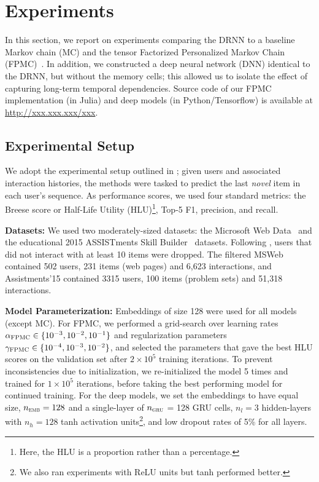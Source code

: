 \documentclass{sig-alternate-05-2015}
\begin{document}
\section{Experiments}
In this section, we report on experiments comparing the DRNN to a baseline Markov chain (MC) and the tensor Factorized Personalized Markov Chain (FPMC)~\cite{Rendle2010}. In addition, we constructed a deep neural network (DNN) identical to the DRNN, but without the memory cells; this allowed us to isolate the effect of capturing long-term temporal dependencies. Source code of our FPMC implementation (in Julia) and deep models (in Python/Tensorflow) is available at \url{http://xxx.xxx.xxx/xxx}.

\subsection{Experimental Setup}
We adopt the experimental setup outlined in \cite{Rendle2010};  given users and associated interaction histories, the methods were tasked to predict the last \emph{novel} item in each user's sequence. As performance scores, we used four standard metrics: the Breese score or Half-Life Utility (HLU)\footnote{Here, the HLU is a proportion rather than a percentage.}, Top-5 F1, precision, and recall. 

\vspace{2mm}
\noindent\textbf{Datasets:} We used two moderately-sized datasets: the Microsoft Web Data~\cite{Breese1998} and the educational 2015 ASSISTments Skill Builder~\cite{Assistmentsdata} datasets. Following \cite{Rendle2010}, users that did not interact with at least 10 items were dropped. The filtered MSWeb contained 502 users, 231 items (web pages) and 6,623 interactions, and  Assistments'15 contained 3315 users, 100 items (problem sets) and 51,318 interactions. 

\vspace{2mm}
\noindent\textbf{Model Parameterization:} Embeddings of size 128 were used for all models (except MC). For FPMC, we performed a grid-search over learning rates $\alpha_\textsc{FPMC} \in \{10^{-3},10^{-2},10^{-1}\}$ and regularization parameters $\gamma_\textsc{FPMC} \in \{10^{-4},10^{-3},10^{-2}\}$, and selected the parameters that gave the best HLU scores on the validation set after $2\times10^5$ training iterations. To prevent inconsistencies due to initialization, we re-initialized the model 5 times and trained for $1\times10^5$ iterations, before taking the best performing model for continued training. For the deep models,  we set the embeddings to have equal size, $n_\textsc{emb} =128$ and a single-layer of $n_\textsc{gru}$ = 128 GRU cells, $n_l=3$ hidden-layers with $n_h= 128$ tanh activation units\footnote{We also ran experiments with ReLU units but tanh performed better.}, and low dropout rates of 5\% for all layers. 
\end{document}
